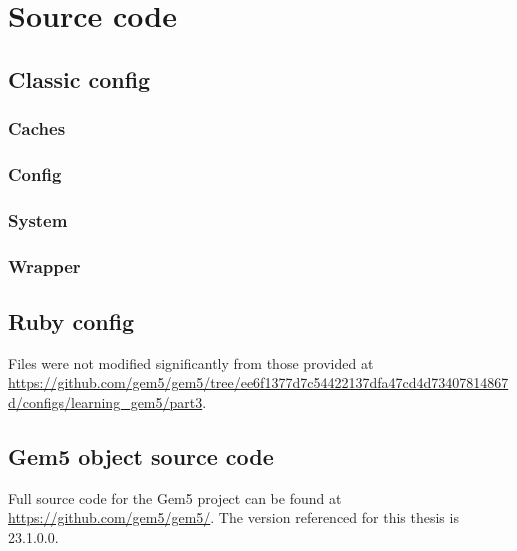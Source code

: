 \documentclass[12pt,twoside]{reedthesis}
\newcommand{\vstep}{\vspace{5mm}}
\begin{document}
\chapter{Source code}

\section{Classic config}

\subsection*{Caches}

\vstep

\subsection*{Config}

\vstep

\subsection*{System}

\vstep

\subsection*{Wrapper}

\vstep

\section{Ruby config}

Files were not modified significantly from those provided at \url{https://github.com/gem5/gem5/tree/ee6f1377d7c54422137dfa47cd4d73407814867d/configs/learning_gem5/part3}.

\section{Gem5 object source code}

Full source code for the Gem5 project can be found at \url{https://github.com/gem5/gem5/}. The version referenced for this thesis is 23.1.0.0.

\nocite{*}
\printbibliography[title=References]
\end{document}

